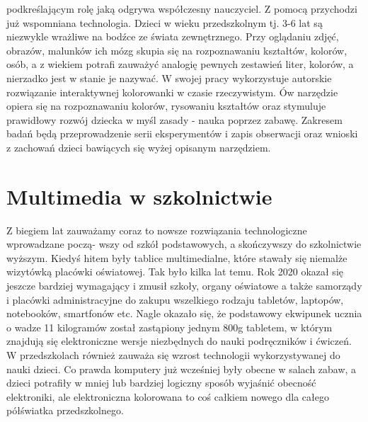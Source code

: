 \documentclass{article}
\begin{document}
podkreślającym rolę jaką odgrywa współczesny nauczyciel. Z pomocą przychodzi już wspomniana technologia. Dzieci w wieku przedszkolnym tj. 3-6 lat są niezwykle wrażliwe na bodźce ze świata zewnętrznego. Przy oglądaniu zdjęć, obrazów, malunków ich mózg skupia się na rozpoznawaniu kształtów, kolorów, osób, a z wiekiem potrafi zauważyć analogię pewnych zestawień liter, kolorów, a nierzadko jest w stanie je nazywać. W swojej pracy wykorzystuje autorskie rozwiązanie interaktywnej kolorowanki w czasie rzeczywistym. Ów narzędzie opiera się na rozpoznawaniu kolorów, rysowaniu kształtów oraz stymuluje prawidłowy rozwój dziecka w myśl zasady - nauka poprzez zabawę. Zakresem badań będą przeprowadzenie serii eksperymentów i zapis obserwacji oraz wnioski z zachowań dzieci bawiących się wyżej opisanym narzędziem.
\section*{\textbf{Multimedia w szkolnictwie}}
Z biegiem lat zauważamy coraz to nowsze rozwiązania technologiczne wprowadzane począ- wszy od szkół podstawowych, a skończywszy do szkolnictwie wyższym. Kiedyś hitem były tablice multimedialne, które stawały się niemalże wizytówką placówki oświatowej. Tak było kilka lat temu. Rok 2020 okazał się jeszcze bardziej wymagający i zmusił szkoły, organy oświatowe a także samorządy i placówki administracyjne do zakupu wszelkiego rodzaju tabletów, laptopów, notebooków, smartfonów etc. Nagle okazało się, że podstawowy ekwipunek ucznia o wadze 11 kilogramów został zastąpiony jednym 800g tabletem, w którym znajdują się elektroniczne wersje niezbędnych do nauki podręczników i ćwiczeń. W przedszkolach również zauważa się wzrost technologii wykorzystywanej do nauki dzieci. Co prawda komputery już wcześniej były obecne w salach zabaw, a dzieci potrafiły w mniej lub bardziej logiczny sposób wyjaśnić obecność elektroniki, ale elektroniczna kolorowana to coś całkiem nowego dla całego półświatka przedszkolnego. 
\end{document}
